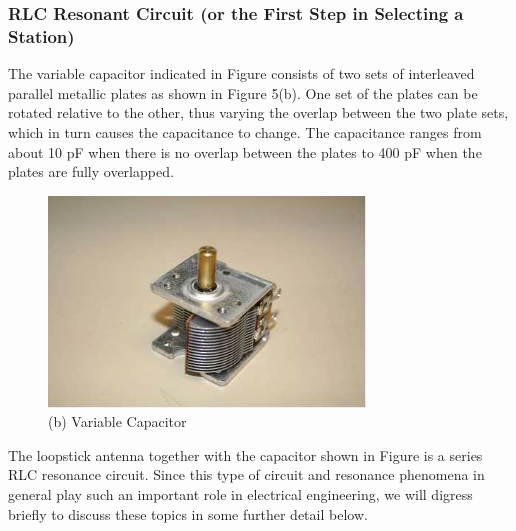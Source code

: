 \documentclass[utf8]{article}
\begin{document}
\subsubsection{RLC Resonant Circuit (or the First Step in Selecting a Station)}
{
	The variable capacitor indicated in Figure  consists of two sets of interleaved parallel metallic plates as shown in Figure 5(b). One set of the plates can be rotated relative to the other, thus varying the overlap between the two plate sets, which in turn causes the capacitance to change. The capacitance ranges from about 10 pF when there is no overlap between the plates to 400 pF when the plates are fully overlapped.

	\begin{figure}[H]
		\begin{small}
			\begin{center}
				\includegraphics[width=0.75\textwidth]{figures/Figure5.png}
			\end{center}
			\caption{(b) Variable Capacitor}
			\label{fig:antenna_2}
		\end{small}
	\end{figure}

	The loopstick antenna together with the capacitor shown in Figure is a series RLC resonance circuit. Since this type of circuit and resonance phenomena in general play such an important role in electrical engineering, we will digress briefly to discuss these topics in some further detail below.

}
\end{document}
